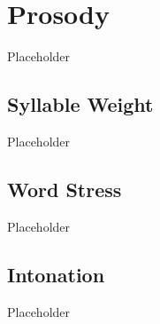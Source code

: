 \section{Prosody}
\label{sec:tvk-prosody}

Placeholder

\subsection{Syllable Weight}
\label{subsec:tvk-syll-weight}

Placeholder

\subsection{Word Stress}
\label{subsec:tvk-word-stress}

Placeholder

\subsection{Intonation}
\label{subsec:tvk-intonation}

Placeholder